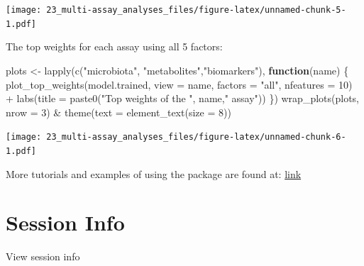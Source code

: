 \documentclass[
]{book}
\newenvironment{Shaded}{\begin{snugshade}}{\end{snugshade}}
\newcommand{\AttributeTok}[1]{\textcolor[rgb]{0.77,0.63,0.00}{#1}}
\newcommand{\ControlFlowTok}[1]{\textcolor[rgb]{0.13,0.29,0.53}{\textbf{#1}}}
\newcommand{\DecValTok}[1]{\textcolor[rgb]{0.00,0.00,0.81}{#1}}
\newcommand{\FunctionTok}[1]{\textcolor[rgb]{0.00,0.00,0.00}{#1}}
\newcommand{\NormalTok}[1]{#1}
\newcommand{\OtherTok}[1]{\textcolor[rgb]{0.56,0.35,0.01}{#1}}
\newcommand{\SpecialCharTok}[1]{\textcolor[rgb]{0.00,0.00,0.00}{#1}}
\newcommand{\StringTok}[1]{\textcolor[rgb]{0.31,0.60,0.02}{#1}}
\begin{document}
\texttt{[image: 23\_multi-assay\_analyses\_files/figure-latex/unnamed-chunk-5-1.pdf]}

The top weights for each assay using all 5 factors:

\begin{Shaded}
\begin{Highlighting}[]
\NormalTok{plots }\OtherTok{\textless{}{-}} \FunctionTok{lapply}\NormalTok{(}\FunctionTok{c}\NormalTok{(}\StringTok{"microbiota"}\NormalTok{, }\StringTok{"metabolites"}\NormalTok{,}\StringTok{"biomarkers"}\NormalTok{), }\ControlFlowTok{function}\NormalTok{(name) \{}
    \FunctionTok{plot\_top\_weights}\NormalTok{(model.trained,}
                     \AttributeTok{view =}\NormalTok{ name,}
                     \AttributeTok{factors =} \StringTok{"all"}\NormalTok{,}
                     \AttributeTok{nfeatures =} \DecValTok{10}\NormalTok{) }\SpecialCharTok{+}
        \FunctionTok{labs}\NormalTok{(}\AttributeTok{title =} \FunctionTok{paste0}\NormalTok{(}\StringTok{"Top weights of the "}\NormalTok{, name,}\StringTok{" assay"}\NormalTok{))}
\NormalTok{\})}
\FunctionTok{wrap\_plots}\NormalTok{(plots, }\AttributeTok{nrow =} \DecValTok{3}\NormalTok{) }\SpecialCharTok{\&} \FunctionTok{theme}\NormalTok{(}\AttributeTok{text =} \FunctionTok{element\_text}\NormalTok{(}\AttributeTok{size =} \DecValTok{8}\NormalTok{))}
\end{Highlighting}
\end{Shaded}

\texttt{[image: 23\_multi-assay\_analyses\_files/figure-latex/unnamed-chunk-6-1.pdf]}

More tutorials and examples of using the package are found at: \href{https://biofam.github.io/MOFA2/tutorials.html}{link}

\hypertarget{session-info-9}{%
\section*{Session Info}\label{session-info-9}}

View session info
\end{document}
